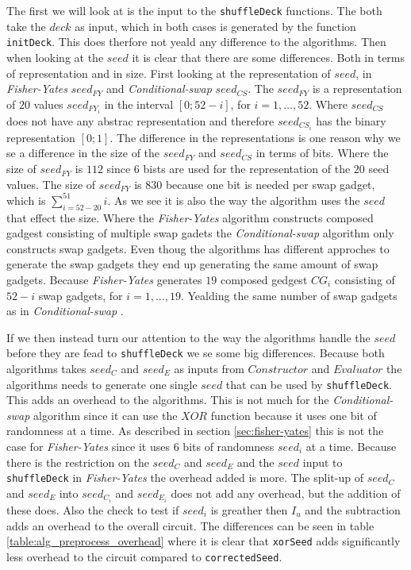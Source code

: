 \documentclass[twoside,11pt,openright]{report}
\newcommand{\FY}{\textit{Fisher-Yates} }
\newcommand{\CS}{\textit{Conditional-swap} }
\begin{document}
\bigskip

The first we will look at is the input to the \verb|shuffleDeck| functions. The both take the $deck$ as input, which in both cases is generated by the function \verb|initDeck|. This does therfore not yeald any difference to the algorithms. Then when looking at the $seed$ it is clear that there are some differences. Both in terms of representation and in size. First looking at the representation of $seed$, in \FY $seed_{FY}$ and \CS $seed_{CS}$. The $seed_{FY}$ is a representation of $20$ values $seed_{FY_i}$ in the interval $[0;52-i]$, for $i=1,\dots, 52$. Where $seed_{CS}$ does not have any abstrac representation and therefore $seed_{CS_i}$ has the binary representation $[0;1]$. The difference in the representations is one reason why we se a difference in the size of the $seed_{FY}$ and $seed_{CS}$ in terms of bits. Where the size of $seed_{FY}$ is $112$ since $6$ bists are used for the representation of the $20$ seed values. The size of $seed_{FY}$ is $830$ because one bit is needed per swap gadget, which is $\sum_{i=52-20}^{51} i$. As we see it is also the way the algorithm uses the $seed$ that effect the size. Where the \FY algorithm constructs composed gadgest consisting of multiple swap gadets the \CS algorithm only constructs swap gadgets. Even thoug the algorithms has different approches to generate the swap gadgets they end up generating the same amount of swap gadgets. Because \FY generates $19$ composed gedgest $CG_i$ consisting of $52-i$ swap gadgets, for $i=1,\dots,19$. Yealding the same number of swap gadgets as in \CS .

If we then instead turn our attention to the way the algorithms handle the $seed$ before they are fead to \verb|shuffleDeck| we se some big differences. Because both algorithms takes $seed_C$ and $seed_E$ as inputs from $Constructor$ and $Evaluator$ the algorithms needs to generate one single $seed$ that can be used by \verb|shuffleDeck|. This adds an overhead to the algorithms. This is not much for the \CS algorithm since it can use the $XOR$ function because it uses one bit of randomness at a time. As described in section \ref{sec:fisher-yates} this is not the case for \FY since it uses $6$ bits of randomness $seed_i$ at a time. Because there is the restriction on the $seed_C$ and $seed_E$ and the $seed$ input to \verb|shuffleDeck| in \FY the overhead added is more. The split-up of $seed_C$ and $seed_E$ into $seed_{C_i}$ and $seed_{E_i}$ does not add any overhead, but the addition of these does. Also the check to test if $seed_i$ is greather then $I_u$ and the subtraction adds an overhead to the overall circuit. The differences can be seen in table \ref{table:alg_preprocess_overhead} where it is clear that \verb|xorSeed| adds significantly less overhead to the circuit compared to \verb|correctedSeed|. 
\end{document}
